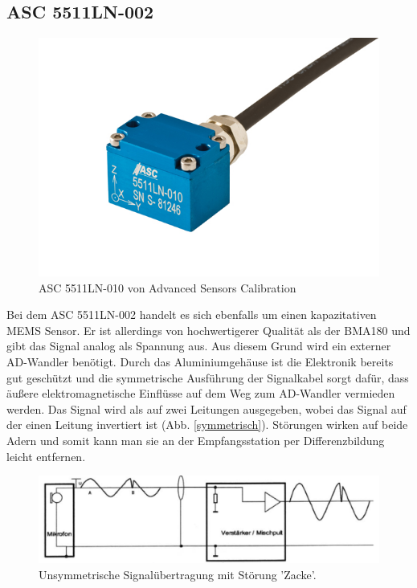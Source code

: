 \documentclass[12pt,a4paper]{scrartcl}
\begin{document}
\subsection{ASC 5511LN-002}

\begin{figure}[H]
\centering
\includegraphics[scale=.5]{hardwareimages/asc.jpg}
\caption{ASC 5511LN-010 von Advanced Sensors Calibration}
\label{asc5511}
\end{figure}

Bei dem ASC 5511LN-002 handelt es sich ebenfalls um einen kapazitativen MEMS Sensor. Er ist allerdings von hochwertigerer Qualität als der BMA180 und gibt das Signal analog als Spannung aus. Aus diesem Grund wird ein externer AD-Wandler benötigt.
Durch das Aluminiumgehäuse ist die Elektronik bereits gut geschützt und die symmetrische Ausführung der Signalkabel sorgt dafür, dass äußere elektromagnetische Einflüsse auf dem Weg zum AD-Wandler vermieden werden. Das Signal wird als auf zwei Leitungen ausgegeben, wobei das Signal auf der einen Leitung invertiert ist (Abb. \ref{symmetrisch}). Störungen wirken auf beide Adern und somit kann man sie an der Empfangsstation per Differenzbildung leicht entfernen. 
\begin{figure}[H]
\centering
\includegraphics[scale=.7]{unsymmetrisch.png}
\caption{Unsymmetrische Signalübertragung mit Störung 'Zacke'. \citep{Sengpiel:2001fk}}
\label{unsymmetrisch}
\end{figure}
\end{document}
